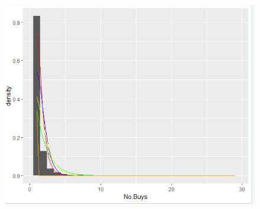\documentclass[11pt, letterpaper]{article} %
\begin{document}
\begin{figure}[ht]

\centering
\includegraphics[scale=0.7]{Q1_graph.PNG}
\label{fig:label}
\end{figure}
\end{document}
